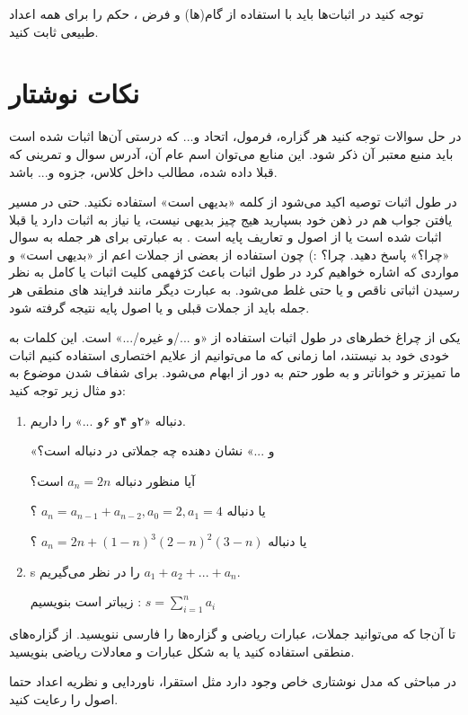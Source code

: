 \documentclass[11pt,largemargins]{h2wp}
\begin{document}
 	 توجه کنید در اثبات‌ها باید با استفاده از گام(ها) و فرض ، حکم را برای همه اعداد طبیعی ثابت کنید.
 
 
\chapter*{
نکات نوشتار}
\notes
{}
در حل سوالات توجه کنید هر گزاره، فرمول، اتحاد و... که درستی آن‌ها اثبات شده است  باید منبع معتبر آن ‌ذکر شود‌. این منابع می‌توان اسم عام آن، آدرس سوال و تمرینی که قبلا داده شده، مطالب داخل کلاس، جزوه و... باشد. 

در طول اثبات توصیه اکید می‌شود از کلمه «بدیهی است» استفاده نکنید. حتی در مسیر یافتن جواب هم در ذهن خود بسپارید هیج چیز بدیهی نیست، یا نیاز به اثبات دارد یا قبلا اثبات شده است یا از اصول و تعاریف پایه است 
.
به عبارتی برای هر جمله به سوال «چرا؟» پاسخ دهید.
چرا؟ :)
چون استفاده از بعضی از جملات اعم از «بدیهی است» و مواردی که اشاره خواهیم کرد در طول اثبات باعث کژفهمی کلیت اثبات یا کامل به نظر رسیدن اثباتی ناقص و یا حتی غلط می‌شود. 
به عبارت دیگر
مانند فرایند های منطقی
هر جمله باید از جملات قبلی و یا اصول پایه نتیجه گرفته شود.

یکی از چراغ خطرهای در طول اثبات استفاده از «و .../و غیره/...» است. این کلمات به خودی خود بد نیستند، اما زمانی که ما می‌توانیم از علایم اختصاری استفاده کنیم اثبات ما تمیزتر و خواناتر و به طور حتم به دور از ابهام می‌شود.
برای شفاف شدن موضوع به دو مثال زیر توجه کنید:

\begin{enumerate}
\item
دنباله «۲و ۴و ۶و ...» را داریم.

«و ...» نشان دهنده چه جملاتی در دنباله است؟

آیا منظور دنباله $a_n =2n $ است؟

یا دنباله $a_n = a_{n-1} + a_{n-2} ,  a_0=2 , a_1=4$ ؟

یا دنباله $ a_n = 2n + (1-n)^3(2-n)^2(3-n) $ ؟ 
\item
s
را در نظر می‌گیریم $ a_1 + a_2 + ... + a_n $. 

زیباتر است بنویسیم :
$ s = \sum_{i=1}^{n} {a_i} $

\end{enumerate}

تا آن‌جا که می‌توانید جملات، عبارات ریاضی و گزاره‌ها را فارسی ننویسید. از گزاره‌های منطقی استفاده کنید یا به شکل عبارات و معادلات ریاضی بنویسید. 

در مباحثی که مدل نوشتاری خاص وجود دارد مثل استقرا، ناوردایی و نظریه اعداد حتما اصول را رعایت کنید.
\end{document}
